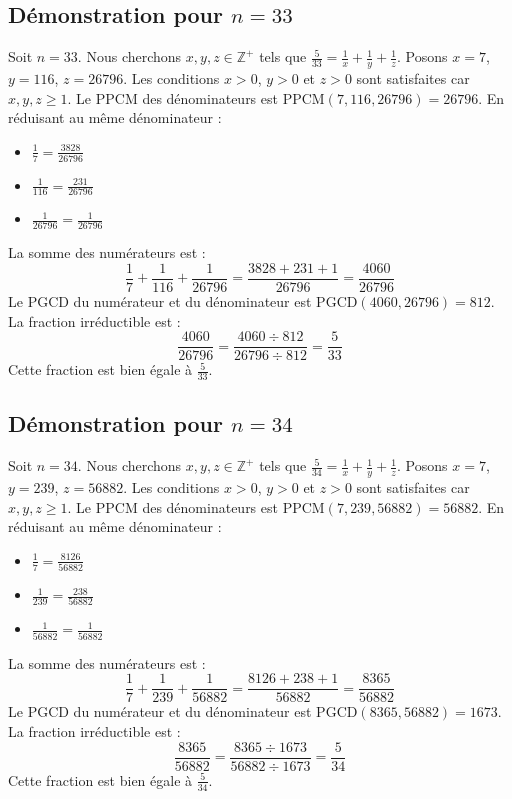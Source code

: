 \documentclass[11pt,a4paper]{article}
\begin{document}
\subsection{Démonstration pour $n = 33$}
Soit $n = 33$. Nous cherchons $x, y, z \in \mathbb{Z}^{+}$ tels que $\frac{5}{33} = \frac{1}{x} + \frac{1}{y} + \frac{1}{z}$.
Posons $x = 7$, $y = 116$, $z = 26796$.
Les conditions $x > 0$, $y > 0$ et $z > 0$ sont satisfaites car $x, y, z \geq 1$.
Le PPCM des dénominateurs est $\text{PPCM}(7, 116, 26796) = 26796$.
En réduisant au même dénominateur :
\begin{itemize}
    \item $\frac{1}{7} = \frac{3828}{26796}$
    \item $\frac{1}{116} = \frac{231}{26796}$
    \item $\frac{1}{26796} = \frac{1}{26796}$
\end{itemize}
La somme des numérateurs est :
$$ \frac{1}{7} + \frac{1}{116} + \frac{1}{26796} = \frac{3828 + 231 + 1}{26796} = \frac{4060}{26796} $$
Le PGCD du numérateur et du dénominateur est $\text{PGCD}(4060, 26796) = 812$.
La fraction irréductible est :
$$ \frac{4060}{26796} = \frac{4060 \div 812}{26796 \div 812} = \frac{5}{33} $$
Cette fraction est bien égale à $\frac{5}{33}$.

\subsection{Démonstration pour $n = 34$}
Soit $n = 34$. Nous cherchons $x, y, z \in \mathbb{Z}^{+}$ tels que $\frac{5}{34} = \frac{1}{x} + \frac{1}{y} + \frac{1}{z}$.
Posons $x = 7$, $y = 239$, $z = 56882$.
Les conditions $x > 0$, $y > 0$ et $z > 0$ sont satisfaites car $x, y, z \geq 1$.
Le PPCM des dénominateurs est $\text{PPCM}(7, 239, 56882) = 56882$.
En réduisant au même dénominateur :
\begin{itemize}
    \item $\frac{1}{7} = \frac{8126}{56882}$
    \item $\frac{1}{239} = \frac{238}{56882}$
    \item $\frac{1}{56882} = \frac{1}{56882}$
\end{itemize}
La somme des numérateurs est :
$$ \frac{1}{7} + \frac{1}{239} + \frac{1}{56882} = \frac{8126 + 238 + 1}{56882} = \frac{8365}{56882} $$
Le PGCD du numérateur et du dénominateur est $\text{PGCD}(8365, 56882) = 1673$.
La fraction irréductible est :
$$ \frac{8365}{56882} = \frac{8365 \div 1673}{56882 \div 1673} = \frac{5}{34} $$
Cette fraction est bien égale à $\frac{5}{34}$.
\end{document}
